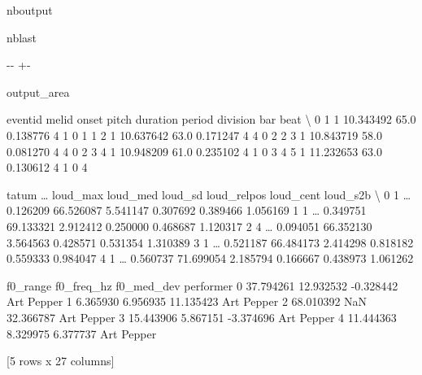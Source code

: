 \documentclass[letterpaper,10pt,english]{sphinxmanual}
\newlength\nbsphinxcodecellspacing
\begin{document}
\begin{sphinxuseclass}{nboutput}
\begin{sphinxuseclass}{nblast}
{

\kern-\sphinxverbatimsmallskipamount\kern-\baselineskip
\kern+\FrameHeightAdjust\kern-\fboxrule
\vspace{\nbsphinxcodecellspacing}

\begin{sphinxuseclass}{output_area}
\begin{sphinxuseclass}{}


\begin{sphinxVerbatim}[commandchars=\\\{\}]
\llap{\color{nbsphinxout}[29]:\,\hspace{\fboxrule}\hspace{\fboxsep}}   eventid  melid      onset  pitch  duration  period  division  bar  beat  \textbackslash{}
0        1      1  10.343492   65.0  0.138776       4         1    0     1
1        2      1  10.637642   63.0  0.171247       4         4    0     2
2        3      1  10.843719   58.0  0.081270       4         4    0     2
3        4      1  10.948209   61.0  0.235102       4         1    0     3
4        5      1  11.232653   63.0  0.130612       4         1    0     4

   tatum  {\ldots}  loud\_max   loud\_med   loud\_sd loud\_relpos  loud\_cent  loud\_s2b  \textbackslash{}
0      1  {\ldots}  0.126209  66.526087  5.541147    0.307692   0.389466  1.056169
1      1  {\ldots}  0.349751  69.133321  2.912412    0.250000   0.468687  1.120317
2      4  {\ldots}  0.094051  66.352130  3.564563    0.428571   0.531354  1.310389
3      1  {\ldots}  0.521187  66.484173  2.414298    0.818182   0.559333  0.984047
4      1  {\ldots}  0.560737  71.699054  2.185794    0.166667   0.438973  1.061262

    f0\_range  f0\_freq\_hz  f0\_med\_dev   performer
0  37.794261   12.932532   -0.328442  Art Pepper
1   6.365930    6.956935   11.135423  Art Pepper
2  68.010392         NaN   32.366787  Art Pepper
3  15.443906    5.867151   -3.374696  Art Pepper
4  11.444363    8.329975    6.377737  Art Pepper

[5 rows x 27 columns]
\end{sphinxVerbatim}



\end{sphinxuseclass}
\end{sphinxuseclass}
}

\end{sphinxuseclass}
\end{sphinxuseclass}
\end{document}
